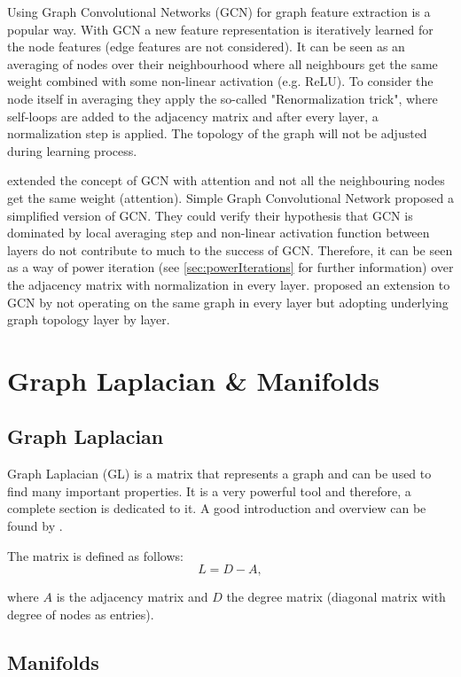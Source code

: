 Using Graph Convolutional Networks (GCN) \cite{GCN} for graph feature extraction is a popular way. 
With GCN a new feature representation is iteratively learned for the node features (edge features are not considered).
It can be seen as an averaging of nodes over their neighbourhood where all neighbours get the same weight combined with some non-linear activation (e.g. ReLU). 
To consider the node itself in averaging they apply the so-called "Renormalization trick", where self-loops are added to the 
adjacency matrix and after every layer, a normalization step is applied. 
The topology of the graph will not be adjusted during  learning process.

\citet{GAT} extended the concept of GCN with attention and not all the neighbouring nodes get the same weight (attention).
Simple Graph Convolutional Network \cite{simpleGCN} proposed a simplified version of GCN.
They could verify their hypothesis that GCN is dominated by local averaging step and non-linear 
activation function between layers do not contribute to much to the success of GCN. 
Therefore, it can be seen as a way of power iteration (see \ref{sec:powerIterations} for further information) over the adjacency matrix with normalization in every layer.
\citet{dynamicGCN} proposed an extension to GCN by not operating on the same graph in every layer but adopting
underlying graph topology layer by layer.

\section{Graph Laplacian \& Manifolds}
\subsection{Graph Laplacian}
Graph Laplacian (GL) is a matrix that represents a graph and can be used to find many important properties.
It is a very powerful tool and therefore, a complete section is dedicated to it.
A good introduction and overview can be found by \cite{tutorialSpectralClustering, SpectralGraphTheory}. 

The matrix is defined as follows:
\begin{equation}
    L = D - A,
\end{equation}

where $A$ is the adjacency matrix and $D$ the degree matrix (diagonal matrix with degree of nodes as entries).

\subsection{Manifolds}
\label{sec:manifolds}

